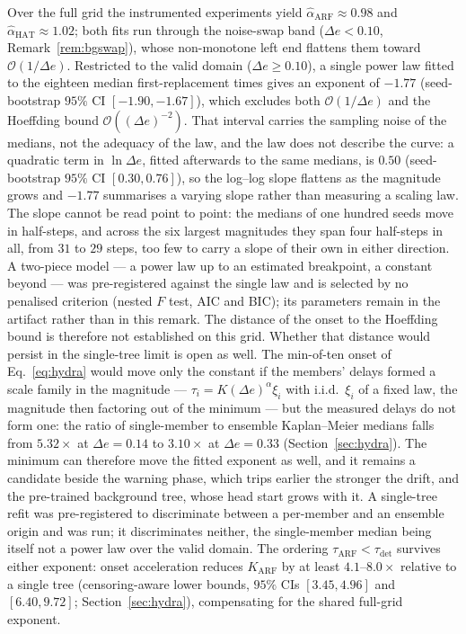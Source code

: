\documentclass[smallextended]{svjour3}
\begin{document}
\begin{remark}\label{rem:exponent}
  Over the full grid the instrumented experiments yield $\hat\alpha_{\mathrm{ARF}} \approx 0.98$ and $\hat\alpha_{\mathrm{HAT}} \approx 1.02$; both fits run through the noise-swap band ($\Delta e < 0.10$, Remark~\ref{rem:bgswap}), whose non-monotone left end flattens them toward $\mathcal{O}(1/\Delta e)$.
  Restricted to the valid domain ($\Delta e \ge 0.10$), a single power law fitted to the eighteen median first-replacement times gives an exponent of $-1.77$ (seed-bootstrap $95\%$ CI $[-1.90, -1.67]$), which excludes both $\mathcal{O}(1/\Delta e)$ and the Hoeffding bound $\mathcal{O}((\Delta e)^{-2})$. That interval carries the sampling noise of the medians, not the adequacy of the law, and the law does not describe the curve: a quadratic term in $\ln \Delta e$, fitted afterwards to the same medians, is $0.50$ (seed-bootstrap $95\%$ CI $[0.30, 0.76]$), so the log--log slope flattens as the magnitude grows and $-1.77$ summarises a varying slope rather than measuring a scaling law. The slope cannot be read point to point: the medians of one hundred seeds move in half-steps, and across the six largest magnitudes they span four half-steps in all, from $31$ to $29$ steps, too few to carry a slope of their own in either direction. A two-piece model --- a power law up to an estimated breakpoint, a constant beyond --- was pre-registered against the single law and is selected by no penalised criterion (nested $F$ test, AIC and BIC); its parameters remain in the artifact rather than in this remark. The distance of the onset to the Hoeffding bound is therefore not established on this grid.
  Whether that distance would persist in the single-tree limit is open as well. The min-of-ten onset of Eq.~\eqref{eq:hydra} would move only the constant if the members' delays formed a scale family in the magnitude --- $\tau_i = K (\Delta e)^{\alpha}\xi_i$ with i.i.d.\ $\xi_i$ of a fixed law, the magnitude then factoring out of the minimum --- but the measured delays do not form one: the ratio of single-member to ensemble Kaplan--Meier medians falls from $5.32\times$ at $\Delta e = 0.14$ to $3.10\times$ at $\Delta e = 0.33$ (Section~\ref{sec:hydra}). The minimum can therefore move the fitted exponent as well, and it remains a candidate beside the warning phase, which trips earlier the stronger the drift, and the pre-trained background tree, whose head start grows with it. A single-tree refit was pre-registered to discriminate between a per-member and an ensemble origin and was run; it discriminates neither, the single-member median being itself not a power law over the valid domain.
  The ordering $\tau_{\mathrm{ARF}} < \tau_{\mathrm{det}}$ survives either exponent: onset acceleration reduces $K_{\mathrm{ARF}}$ by at least $4.1$--$8.0\times$ relative to a single tree (censoring-aware lower bounds, $95\%$ CIs $[3.45, 4.96]$ and $[6.40, 9.72]$; Section~\ref{sec:hydra}), compensating for the shared full-grid exponent.
\end{remark}
\end{document}

